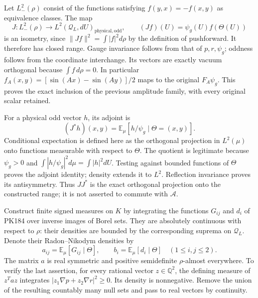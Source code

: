 \documentclass[11pt]{article}
\begin{document}
Let \(L^2_-(\rho)\) consist of the functions satisfying
\(f(y,x)=-f(x,y)\) as equivalence classes. The map
\[
 J:L^2_-(\rho)\longrightarrow
        L^2(\mathcal Q_L,dU)_{\mathrm{physical,odd}},\qquad
 (Jf)(U)=\psi_g(U)f(\Theta(U))
 \tag{PK191}
\]
is an isometry, since \(\|Jf\|^2=\int|f|^2d\rho\) by the
definition of pushforward. It therefore has closed range.
Gauge invariance follows from that of \(p,r,\psi_g\); oddness
follows from the coordinate interchange. Its vectors are exactly
vacuum orthogonal because \(\int f\,d\rho=0\).
In particular \(f_A(x,y)=[\sin(Ax)-\sin(Ay)]/2\) maps to
the original \(F_A\psi_g\). This proves the exact inclusion of the
previous amplitude family, with every original scalar retained.

For a physical odd vector \(h\), its adjoint is
\[
 (J^*h)(x,y)
   =\mathbb E_\mu[h/\psi_g\mid\Theta=(x,y)] .
 \tag{PK192}
\]
Conditional expectation is defined here as the orthogonal projection
in \(L^2(\mu)\) onto functions measurable with respect to \(\Theta\).
The quotient is legitimate because \(\psi_g>0\) and
\(\int|h/\psi_g|^2d\mu=\int|h|^2dU\).
Testing against bounded functions of \(\Theta\) proves the adjoint
identity; density extends it to \(L^2\).
Reflection invariance proves its antisymmetry.
Thus \(JJ^*\) is the exact orthogonal projection onto the
constructed range; it is not asserted to commute with \(\mathcal A\).

Construct finite signed measures on \(K\) by integrating the
functions \(G_{ij}\) and \(d_i\) of PK184 over inverse images of
Borel sets. They are absolutely continuous with respect to \(\rho\):
their densities are bounded by the corresponding suprema on
\(\mathcal Q_L\). Denote their Radon–Nikodym densities by
\[
 a_{ij}=\mathbb E_\mu[G_{ij}\mid\Theta],\qquad
 b_i=\mathbb E_\mu[d_i\mid\Theta]\quad(1\le i,j\le2).
 \tag{PK193}
\]
The matrix \(a\) is real symmetric and positive semidefinite
\(\rho\)-almost everywhere. To verify the last assertion,
for every rational vector \(z\in\mathbb Q^2\), the defining
measure of \(z^Ta z\) integrates
\(|z_1\nabla p+z_2\nabla r|^2\ge0\).
Its density is nonnegative. Remove the union of the resulting
countably many null sets and pass to real vectors by continuity.
\end{document}
